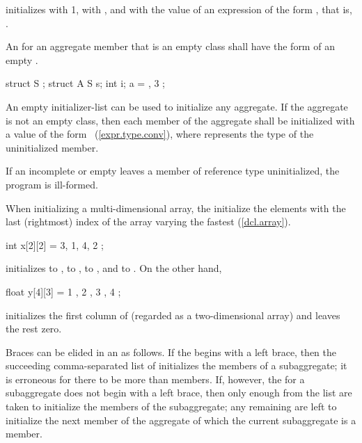 initializes
with 1,
with ,
and
with the value of an expression of the form
,
that is,
.
\exitexample

\pnum
An  for an aggregate member that is an empty
class shall have the form of an empty 
\tcode{\{\}}.
\enterexample

\begin{codeblock}
struct S { };
struct A {
	S s;
	int i;
} a = { { } , 3 };
\end{codeblock}
\exitexampleb
An empty initializer-list can be used to initialize any aggregate.
If the aggregate is not an empty class, then each member of the
aggregate shall be initialized with a value of the form
~(\ref{expr.type.conv}), where  represents the
type of the uninitialized member.

\pnum
If an incomplete or empty  leaves a member
of reference type uninitialized, the program is ill-formed.

\pnum
When initializing a multi-dimensional array,
the
initialize the elements with the last (rightmost) index of the array
varying the fastest (\ref{dcl.array}).
\enterexample

\begin{codeblock}
int x[2][2] = { 3, 1, 4, 2 };
\end{codeblock}

initializes
to
,
to
,
to
,
and
to
.
On the other hand,

\begin{codeblock}
float y[4][3] = {
    { 1 }, { 2 }, { 3 }, { 4 }
};
\end{codeblock}

initializes the first column of
(regarded as a two-dimensional array)
and leaves the rest zero.
\exitexample

\pnum
Braces can be elided in an
as follows.
If the
begins with a left brace,
then the succeeding comma-separated list of
initializes the members of a subaggregate;
it is erroneous for there to be more
than members.
If, however, the
for a subaggregate does not begin with a left brace,
then only enough
from the list are taken to initialize the members of the subaggregate;
any remaining
are left to initialize the next member of the aggregate
of which the current subaggregate is a member.
\enterexample

